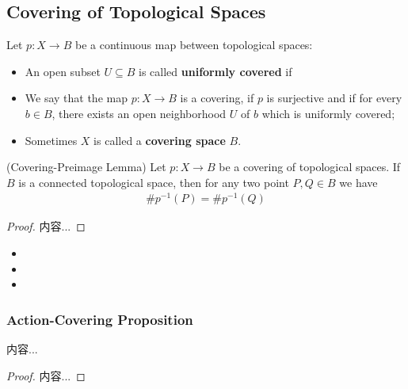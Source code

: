 \documentclass[Total.tex]{subfiles}
\begin{document}
			\subsection{Covering of Topological Spaces}
			\begin{Def}
				Let $p:X\rightarrow B$ be a continuous map between topological spaces:
				\begin{itemize}
					\item An open subset $U\subseteq B$ is called \textbf{uniformly covered} if 
					\item We say that the map $p:X\rightarrow B$ is a covering, if $p$ is surjective and if for every $b\in B$, there exists an open neighborhood $U$ of $b$ which is uniformly covered;
					\item Sometimes $X$ is called a \textbf{covering space} $B$.
				\end{itemize}
			\end{Def}
			\begin{lemma}
				(Covering-Preimage Lemma) Let $p:X\rightarrow B$ be a covering of topological spaces. If $B$ is a connected topological space, then for any two point $P,Q\in B$ we have
				\begin{gather*}
					\#p^{-1}(P)=\#p^{-1}(Q)
				\end{gather*}
			\end{lemma}
			\begin{proof}
				内容...
			\end{proof}
			
			\begin{Def}
				\begin{itemize}
					\item 
					\item 
					\item 
				\end{itemize}
			\end{Def}
			\subsubsection{Action-Covering Proposition}
			\begin{proposition}
				内容...
			\end{proposition}
			\begin{proof}
				内容...
			\end{proof}
\end{document}
